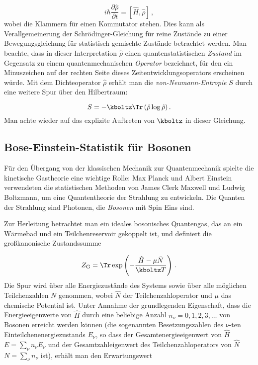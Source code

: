 \begin{equation*}\label{eq:vNeumann}
  i \hbar \frac{\partial \hat \rho}{\partial t}=\left[\hat H, \hat \rho\right]\,,
\end{equation*}
%
wobei die Klammern für einen Kommutator stehen. Dies kann als Verallgemeinerung der Schrödinger-Gleichung für reine Zustände zu einer Bewegungsgleichung für statistisch gemischte Zustände betrachtet werden. Man beachte, dass in dieser Interpretation $\hat \rho$ einen quantenstatistischen \emph{Zustand} im Gegensatz zu einem quantenmechanischen \emph{Operator} bezeichnet, für den ein Minuszeichen auf der rechten Seite dieses Zeitentwicklungsoperators erscheinen würde. Mit dem Dichteoperator $\hat \rho$ erhält man die \emph{von-Neumann-Entropie} $S$ durch eine weitere Spur über den Hilbertraum:

\begin{equation*}
  S=-\kboltz \Tr \left( \hat \rho \log \hat \rho \right).
\end{equation*}
%
Man achte wieder auf das explizite Auftreten von $\kboltz$ in dieser Gleichung.


\subsection*{Bose-Einstein-Statistik für Bosonen}

Für den Übergang von der klassischen Mechanik zur Quantenmechanik spielte die kinetische Gastheorie eine wichtige Rolle: Max Planck und Albert Einstein verwendeten die statistischen Methoden von James Clerk Maxwell und Ludwig Boltzmann, um eine Quantentheorie der Strahlung zu entwickeln. Die Quanten der Strahlung sind Photonen, die \emph{Bosonen} mit Spin Eins sind.

Zur Herleitung betrachtet man ein ideales bosonisches Quantengas, das an ein Wärmebad und ein Teilchenreservoir gekoppelt ist, und definiert die großkanonische Zustandssumme

\begin{equation*}
  Z_{\mathrm{G}}=\Tr \exp\left(-\frac{\hat H-\mu \bar N}{\kboltz T} \right)\,.
\end{equation*}
%
Die Spur wird über alle Energiezustände des Systems sowie über alle möglichen Teilchenzahlen $N$ genommen, wobei $\hat N$ der Teilchenzahloperator und $\mu$ das chemische Potential ist. Unter Annahme der grundlegenden Eigenschaft, dass die Energieeigenwerte von $\hat H$ durch eine beliebige Anzahl $n_\nu=0,1,2,3, \ldots$ von Bosonen erreicht werden können (die sogenannten Besetzungszahlen des $\nu$-ten Einteilchenenergiezustands $E_\nu$, so dass der Gesamtenergieeigenwert von $\hat H$ $E=\sum_\nu n_\nu E_\nu$ und der Gesamtzahleigenwert des Teilchenzahloperators von $\hat N$ $N=\sum_\nu n_\nu$ ist), erhält man den Erwartungswert

